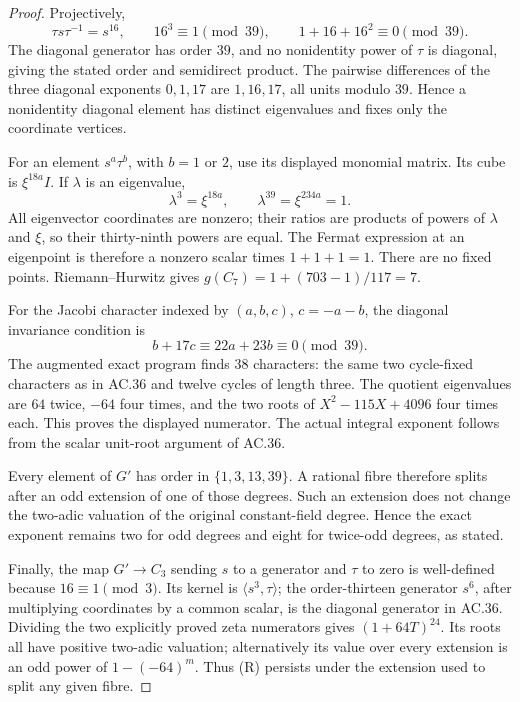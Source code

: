 \begin{proof}
Projectively,
\[
       \tau s\tau^{-1}=s^{16},\qquad
       16^3\equiv1\pmod{39},\qquad
       1+16+16^2\equiv0\pmod{39}.
\]
The diagonal generator has order \(39\), and no nonidentity
power of \(\tau\) is diagonal, giving the stated order
and semidirect product. The pairwise differences of the
three diagonal exponents \(0,1,17\) are \(1,16,17\),
all units modulo \(39\). Hence a nonidentity diagonal
element has distinct eigenvalues and fixes only the
coordinate vertices.

For an element \(s^a\tau^b\), with \(b=1\) or \(2\),
use its displayed monomial matrix. Its cube is
\(\xi^{18a}I\). If \(\lambda\) is an eigenvalue,
\[
              \lambda^3=\xi^{18a},\qquad
              \lambda^{39}=\xi^{234a}=1.
\]
All eigenvector coordinates are nonzero; their ratios
are products of powers of \(\lambda\) and \(\xi\),
so their thirty-ninth powers are equal. The Fermat
expression at an eigenpoint is therefore a nonzero
scalar times \(1+1+1=1\). There are no fixed points.
Riemann--Hurwitz gives
\(g(C_7)=1+(703-1)/117=7\).

For the Jacobi character indexed by \((a,b,c)\),
\(c=-a-b\), the diagonal invariance condition is
\[
                   b+17c\equiv22a+23b\equiv0\pmod{39}.
\]
The augmented exact program finds \(38\) characters:
the same two cycle-fixed characters as in AC.36 and
twelve cycles of length three. The quotient eigenvalues
are \(64\) twice, \(-64\) four times, and the two
roots of \(X^2-115X+4096\) four times each.
This proves the displayed numerator. The actual
integral exponent follows from the scalar unit-root
argument of AC.36.

Every element of \(G'\) has order in
\(\{1,3,13,39\}\). A rational fibre therefore splits
after an odd extension of one of those degrees.
Such an extension does not change the two-adic valuation
of the original constant-field degree. Hence the exact
exponent remains two for odd degrees and eight for
twice-odd degrees, as stated.

Finally, the map \(G'\to C_3\) sending \(s\) to a
generator and \(\tau\) to zero is well-defined because
\(16\equiv1\pmod3\). Its kernel is
\(\langle s^3,\tau\rangle\); the order-thirteen
generator \(s^6\), after multiplying coordinates by
a common scalar, is the diagonal generator in AC.36.
Dividing the two explicitly proved zeta numerators gives
\((1+64T)^{24}\). Its roots all have positive two-adic
valuation; alternatively its value over every extension
is an odd power of \(1-(-64)^m\). Thus (R) persists
under the extension used to split any given fibre.
\end{proof}

